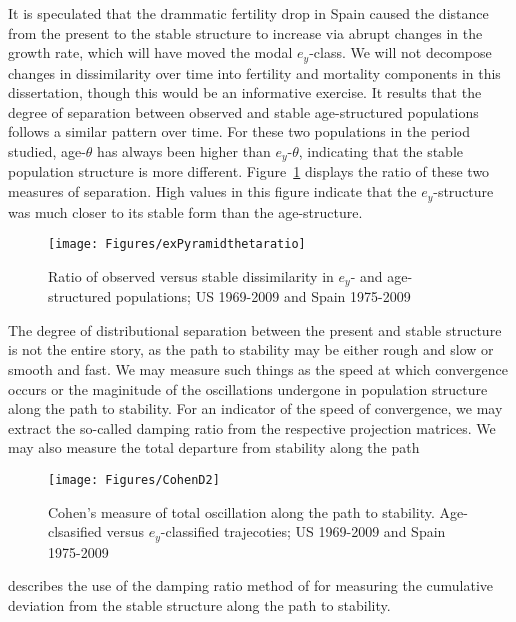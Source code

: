 It is speculated that the drammatic fertility drop in Spain caused the distance
from the present to the stable structure to increase via abrupt changes in the
growth rate, which will have moved the modal $e_y$-class. We will not decompose
changes in dissimilarity over time into fertility and
mortality components in this dissertation, though this would be an informative
exercise. It results that the degree of separation between
observed and stable age-structured populations follows a similar pattern over
time. For these two populations in the period studied, age-$\theta$ has always
been higher than $e_y$-$\theta$, indicating that the stable population structure
is more different. Figure~\ref{fig:exPyramidthetaratio} displays the ratio of
these two measures of separation. High values in this figure indicate that the
$e_y$-structure was much closer to its stable form than the age-structure.

\begin{figure}
       \centering
       \caption{Ratio of observed versus stable dissimilarity in $e_y$- and
       age-structured populations; US 1969-2009 and Spain 1975-2009}
        \texttt{[image: Figures/exPyramidthetaratio]}
        \label{fig:exPyramidthetaratio}
\end{figure}

The degree of distributional separation between the present and stable
structure is not the entire story, as the path to stability may be either
rough and slow or smooth and fast. We may measure such things as the speed at
which convergence occurs or the maginitude of the oscillations undergone in
population structure along the path to stability. For an indicator of the speed
of convergence, we may extract the so-called damping ratio from the
respective projection matrices. We may also measure the total departure from
stability along the path


\begin{figure}
       \centering
       \caption{Cohen's measure of total oscillation along the path to
       stability. Age-clsasified versus $e_y$-classified trajecoties; US
       1969-2009 and Spain 1975-2009}
        \texttt{[image: Figures/CohenD2]}
        \label{fig:exCohenD2}
\end{figure}

\citet[p. 101]{caswell2001matrix} describes the
use of the damping ratio method of \citet{cohen1979cumulative} for measuring the
cumulative deviation from the stable structure along the path to stability.

